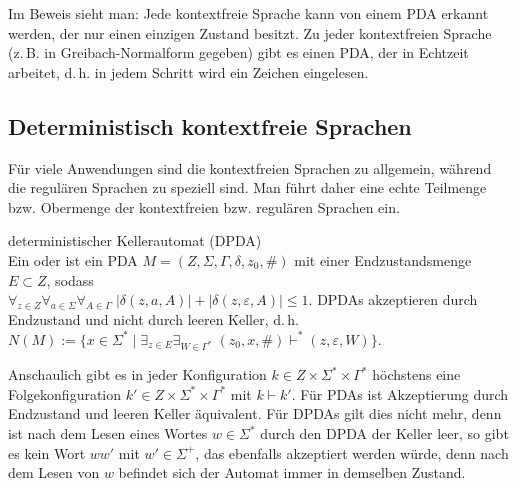 \begin{Bem}
    Im Beweis sieht man:
    Jede kontextfreie Sprache kann von einem PDA erkannt werden, der nur
    einen einzigen Zustand besitzt.
    Zu jeder kontextfreien Sprache
    (z.\,B. in Greibach-Normalform gegeben)
    gibt es einen PDA, der in Echtzeit arbeitet, d.\,h. in jedem Schritt wird
    ein Zeichen eingelesen.
\end{Bem}

\pagebreak

\subsection{%
    Deterministisch kontextfreie Sprachen%
}

\begin{Bem}
    Für viele Anwendungen sind die kontextfreien Sprachen zu allgemein,
    während die regulären Sprachen zu speziell sind.
    Man führt daher eine echte Teilmenge bzw. Obermenge der kontextfreien bzw.
    regulären Sprachen ein.
\end{Bem}

\begin{Def}{deterministischer Kellerautomat (DPDA)}\\
    Ein  oder
     ist ein
    PDA $M = (Z, \Sigma, \Gamma, \delta, z_0, \#)$ mit einer
    Endzustandsmenge $E \subset Z$, sodass\\
    $\forall_{z \in Z} \forall_{a \in \Sigma} \forall_{A \in \Gamma}\;
    |\delta(z, a, A)| + |\delta(z, \varepsilon, A)| \le 1$.
    DPDAs akzeptieren durch Endzustand und nicht durch leeren Keller, d.\,h.
    $N(M) := \{x \in \Sigma^\ast \;|\;
    \exists_{z \in E} \exists_{W \in \Gamma^\ast}\;
    (z_0, x, \#) \vdash^\ast (z, \varepsilon, W)\}$.
\end{Def}

\begin{Bsp}
    Anschaulich gibt es in jeder Konfiguration
    $k \in Z \times \Sigma^\ast \times \Gamma^\ast$ höchstens eine
    Folgekonfiguration $k' \in Z \times \Sigma^\ast \times \Gamma^\ast$ mit
    $k \vdash k'$.
    Für PDAs ist Akzeptierung durch Endzustand und leeren Keller äquivalent.
    Für DPDAs gilt dies nicht mehr, denn ist nach dem Lesen eines Wortes
    $w \in \Sigma^\ast$ durch den DPDA der Keller leer, so gibt es kein
    Wort $ww'$ mit $w' \in \Sigma^+$, das ebenfalls akzeptiert werden würde,
    denn nach dem Lesen von $w$ befindet sich der Automat immer in demselben
    Zustand.
\end{Bsp}

